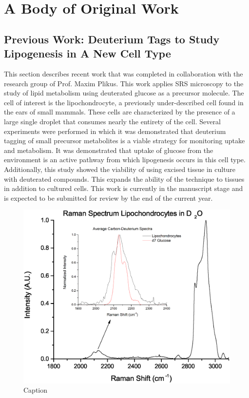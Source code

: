 
\chapter{A Body of Original Work} %

\label{Chapter3} %


\section{Previous Work: Deuterium Tags to Study Lipogenesis in A New Cell Type}
This section describes recent work that was completed in collaboration with the research group of Prof. Maxim Plikus.  This work applies SRS microscopy to the study of lipid metabolism using deuterated glucose as a precursor molecule. The cell of interest is the lipochondrocyte, a previously under-described cell found in the ears of small mammals.  These cells are characterized by the presence of a large single droplet that consumes nearly the entirety of the cell. Several experiments were performed in which it was demonstrated that deuterium tagging of small precursor metabolites is a viable strategy for monitoring uptake and metabolism.  It was demonstrated that uptake of glucose from the environment is an active pathway from which lipogenesis occurs in this cell type. Additionally, this study showed the viability of using excised tissue in culture with deuterated compounds.  This expands the ability of the technique to tissues in addition to cultured cells. This work is currently in the manuscript stage and is expected to be submitted for review by the end of the current year.

\begin{figure}[h]
    \centering
    \includegraphics[width=1\linewidth]{Figures/Multigraph.eps}
    \caption{Caption}
    \label{fig:d7multiple}
\end{figure}

